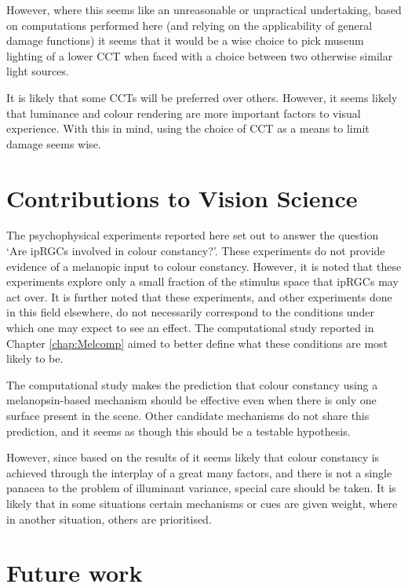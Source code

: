 However, where this seems like an unreasonable or unpractical undertaking, based on computations performed here (and relying on the applicability of general damage functions) it seems that it would be a wise choice to pick museum lighting of a lower \gls{CCT} when faced with a choice between two otherwise similar light sources.

It is likely that some \glspl{CCT} will be preferred over others. However, it seems likely that luminance and colour rendering are more important factors to visual experience. With this in mind, using the choice of \gls{CCT} as a means to limit damage seems wise.

\section{Contributions to Vision Science}

The psychophysical experiments reported here set out to answer the question `Are \glspl{ipRGC} involved in colour constancy?'. These experiments do not provide evidence of a melanopic input to colour constancy. However, it is noted that these experiments explore only a small fraction of the stimulus space that \glspl{ipRGC} may act over. It is further noted that these experiments, and other experiments done in this field elsewhere, do not necessarily correspond to the conditions under which one may expect to see an effect. The computational study reported in Chapter \ref{chap:Melcomp} aimed to better define what these conditions are most likely to be.

The computational study makes the prediction that colour constancy using a melanopsin-based mechanism should be effective even when there is only one surface present in the scene. Other candidate mechanisms do not share this prediction, and it seems as though this should be a testable hypothesis.

However, since based on the results of \citet{kraft_mechanisms_1999} it seems likely that colour constancy is achieved through the interplay of a great many factors, and there is not a single panacea to the problem of illuminant variance, special care should be taken. It is likely that in some situations certain mechanisms or cues are given weight, where in another situation, others are prioritised.

\section{Future work} \label{sec:fut}

